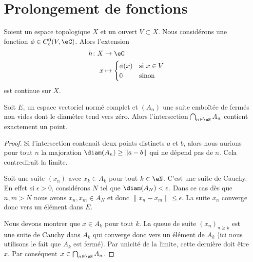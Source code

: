 
\section{Prolongement de fonctions}

\begin{lemma}       \label{LEMooTUQIooEyTLBa}
	Soient un espace topologique \( X\) et un ouvert \( V\subset X\). Nous considérons une fonction \( \phi\in C^0_c(V,\eC)\). Alors l'extension
	\begin{equation}
		\begin{aligned}
			h\colon X & \to\eC                            \\
			x         & \mapsto \begin{cases}
				\phi(x) & \text{si } x\in V \\
				0       & \text{sinon }
			\end{cases}
		\end{aligned}
	\end{equation}
	est continue sur \( X\).
\end{lemma}

\begin{lemma}   \label{LemdCOMQM}
	Soit \( E\), un espace vectoriel normé complet et \( (A_n)\) une suite emboîtée de fermés non vides dont le diamètre tend vers zéro. Alors l'intersection \( \bigcap_{n\in \eN}A_n\) contient exactement un point.
\end{lemma}

\begin{proof}
	Si l'intersection contenait deux points distincts \( a\) et \( b\), alors nous aurions pour tout \( n\) la majoration \( \diam(A_n)\geq\| a-b \|\) qui ne dépend pas de \( n\). Cela contredirait la limite.

	Soit une suite \( (x_n)\) avec \( x_k\in A_k\) pour tout \( k\in \eN\). C'est une suite de Cauchy. En effet si \( \epsilon>0\), considérons \( N\) tel que \( \diam(A_N)<\epsilon\). Dans ce cas dès que \( n,m>N\) nous avons \( x_n,x_m\in A_{N}\) et donc \( \| x_n-x_m \|\leq \epsilon\). La suite \( x_n\) converge donc vers un élément dans \( E\).

	Nous devons montrer que \( x\in A_k\) pour tout \( k\). La queue de suite \( (x_n)_{n\geq k}\) est une suite de Cauchy dans \( A_k\) qui converge donc vers un élément de \( A_k\) (ici nous utilisons le fait que \( A_k\) est fermé). Par unicité de la limite, cette dernière doit être \( x\). Par conséquent \( x\in\bigcap_{n\in \eN}A_n\).
\end{proof}


